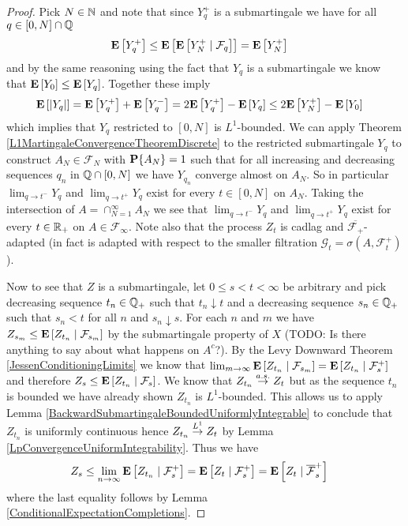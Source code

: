 \begin{proof}
Pick $N \in \naturals$ and note that since $Y^+_q$ is a submartingale
we have for all $q \in [0,N] \cap \rationals$
\begin{align*}
\expectation{Y^+_q} &\leq
\expectation{\cexpectationlong{\mathcal{F}_q}{Y^+_N}} = \expectation{Y^+_N}
\end{align*}
and by the same reasoning using the fact that $Y_q$ is a submartingale
we know that $\expectation{Y_0} \leq \expectation{Y_q}$.  Together
these imply 
\begin{align*}
\expectation{\abs{Y_q}} &= \expectation{Y^+_q}  + \expectation{Y^-_q}
= 2\expectation{Y^+_q}  - \expectation{Y_q} \leq 2\expectation{Y^+_N}  - \expectation{Y_0} 
\end{align*}
which implies that $Y_q$ restricted to $[0,N]$ is $L^1$-bounded.
We can apply Theorem \ref{L1MartingaleConvergenceTheoremDiscrete} to
the restricted submartingale $Y_q$ to construct $A_N \in \mathcal{F}_N$ with
$\probability{A_N}=1$ such that for all increasing and decreasing
sequences $q_n$ in $\rationals \cap [0,N]$ we have $Y_{q_n}$ converge
almost on $A_N$.  So in particular $\lim_{q \to t^-} Y_q$ and $\lim_{q
  \to t^+} Y_q$ exist for every $t \in [0,N]$ on $A_N$.  Taking the
intersection of $A = \cap_{N=1}^\infty A_N$ we see that  $\lim_{q \to t^-} Y_q$ and $\lim_{q
  \to t^+} Y_q$ exist for every $t \in \reals_+$ on $A \in
\mathcal{F}_\infty$.  Note also that the process $Z_t$ is cadlag and
$\overline{\mathcal{F}_+}$-adapted (in fact is adapted with respect to
the smaller filtration $\mathcal{G}_t = \sigma(A, \mathcal{F}^+_t)$).

Now to see that $Z$ is a submartingale, let $0 \leq s < t < \infty$ be
arbitrary and pick decreasing sequence $t_n \in \rationals_+$
such that $t_n \downarrow t$ and a decreasing sequence $s_n \in
\rationals_+$ such that $s_n < t$ for all $n$ and  $s_n \downarrow s$.
For each $n$ and $m$ we have
$Z_{s_m} \leq \cexpectationlong{\mathcal{F}_{s_m}}{Z_{t_n}}$ by the
submartingale property of $X$ (TODO: Is there anything to say about
what happens on $A^c$?).  By the Levy Downward Theorem
\ref{JessenConditioningLimits} we know that $\lim_{m \to \infty}
\cexpectationlong{\mathcal{F}_{s_m}}{Z_{t_n}} =
\cexpectationlong{\mathcal{F}^+_{s}}{Z_{t_n}}$ and therefore $Z_s \leq \cexpectationlong{\mathcal{F}_{s}}{Z_{t_n}}$.
We know that $Z_{t_n} \toas Z_t$ but as the sequence $t_n$ is bounded
we have already shown
$Z_{t_n}$ is $L^1$-bounded.  This allows us to apply Lemma
\ref{BackwardSubmartingaleBoundedUniformlyIntegrable} to conclude that
$Z_{t_n}$ is uniformly continuous hence $Z_{t_n} \tolp{1} Z_t$ by
Lemma \ref{LpConvergenceUniformIntegrability}.  Thus we have 
\begin{align*}
Z_s &\leq \lim_{n \to \infty}
\cexpectationlong{\mathcal{F}^+_s}{Z_{t_n}} =
\cexpectationlong{\mathcal{F}^+_s}{Z_{t}} =
\cexpectationlong{\overline{\mathcal{F}}^+_s}{Z_{t}}
\end{align*}
where the last equality follows by Lemma \ref{ConditionalExpectationCompletions}.


\end{proof}
